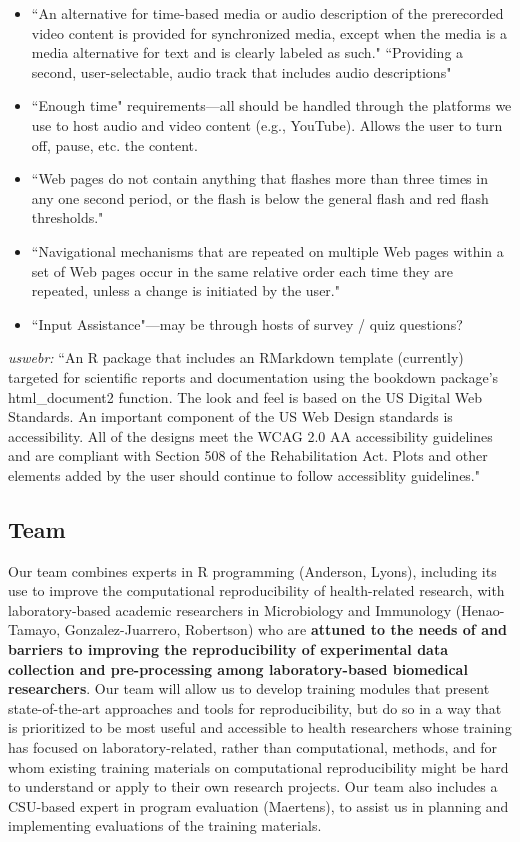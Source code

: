 \documentclass[pdftex,english,11pt,parskip=half]{scrartcl}
\begin{document}
\begin{itemize}
\item ``An alternative for time-based media or audio description of the prerecorded video content is provided for synchronized media, except when the media is a media alternative for text and is clearly labeled as such." ``Providing a second, user-selectable, audio track that includes audio descriptions"
\item ``Enough time" requirements---all should be handled through the platforms we use to host audio and video content (e.g., YouTube). Allows the user to turn off, pause, etc. the content.
\item ``Web pages do not contain anything that flashes more than three times in any one second period, or the flash is below the general flash and red flash thresholds."
\item ``Navigational mechanisms that are repeated on multiple Web pages within a set of Web pages occur in the same relative order each time they are repeated, unless a change is initiated by the user."
\item ``Input Assistance"---may be through hosts of survey / quiz questions?
\end{itemize}

\textit{uswebr:} ``An R package that includes an RMarkdown template (currently) targeted for scientific reports and documentation using the bookdown package's html\_document2 function. The look and feel is based on the US Digital Web Standards. An important component of the US Web Design standards is accessibility. All of the designs meet the WCAG 2.0 AA accessibility guidelines and are compliant with Section 508 of the Rehabilitation Act. Plots and other elements added by the user should continue to follow accessiblity guidelines."

\subsection{Team}

Our team combines experts in R programming (Anderson, Lyons), including its use to improve the computational reproducibility of health-related research, with laboratory-based academic researchers in Microbiology and Immunology (Henao-Tamayo, Gonzalez-Juarrero, Robertson) who are \textbf{attuned to the needs of and barriers to improving the reproducibility of experimental data collection and pre-processing among laboratory-based biomedical researchers}. Our team will allow us to develop training modules that present state-of-the-art approaches and tools for reproducibility, but do so in a way that is prioritized to be most useful and accessible to health researchers whose training has focused on laboratory-related, rather than computational, methods, and for whom existing training materials on computational reproducibility might be hard to understand or apply to their own research projects. Our team also includes a CSU-based expert in program evaluation (Maertens), to assist us in planning and implementing evaluations of the training materials.
\end{document}
